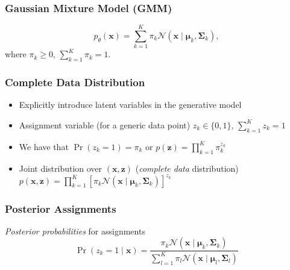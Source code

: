 \documentclass[conference,11pt]{IEEEtran}
\newcommand{\matr}[1]{\boldsymbol{\mathbf{#1}}}
\newcommand{\vect}[1]{\boldsymbol{\mathbf{#1}}}
\newcommand{\normal}{\mathcal{N}}
\begin{document}
\subsubsection{Gaussian Mixture Model (GMM)}
\[
  p_{\theta}(\vect{x}) = \sum_{k=1}^K \pi_k \normal(\vect{x} \mid \vect{\mu}_k,
  \matr{\Sigma}_k),
\]
where $\pi_k \geq 0$, $\sum_{k=1}^K \pi_k = 1$.

\subsubsection{Complete Data Distribution}
\begin{itemize}
  \item Explicitly introduce latent variables in the generative model
  \item Assignment variable (for a generic data point) $z_k \in \{0,1\}$,
    $\sum_{k=1}^K z_k = 1$
  \item We have that $\Pr(z_k = 1) = \pi_k$ or $p(\vect{z}) = \prod_{k=1}^K
    \pi_k^{z_k}$
  \item Joint distribution over $(\vect{x}, \vect{z})$ (\emph{complete data}
    distribution) $p(\vect{x}, \vect{z}) = \prod_{k=1}^K {\left[ \pi_k
        \normal(\vect{x} \mid \vect{\mu}_k, \matr{\Sigma}_k)\right]}^{z_k}$
\end{itemize}

\subsubsection{Posterior Assignments}
\emph{Posterior probabilities} for assignments
\[
  \Pr(z_k = 1 \mid \vect{x}) = \frac{\pi_k \normal(\vect{x} \mid \vect{\mu}_k,
    \matr{\Sigma}_k)}{\sum_{l=1}^K \pi_l \normal(\vect{x} \mid \vect{\mu}_l,
    \matr{\Sigma}_l)}
\]
\end{document}
